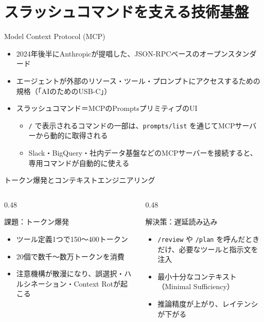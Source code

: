 \documentclass[aspectratio=169,11pt]{beamer}
\newcommand{\cmd}[1]{\texttt{#1}}
\begin{document}
\section{スラッシュコマンドを支える技術基盤}

\begin{frame}{Model Context Protocol (MCP)}
  \begin{itemize}
    \item 2024年後半にAnthropicが提唱した、JSON-RPCベースのオープンスタンダード\cite{r3}
    \item エージェントが外部のリソース・ツール・プロンプトにアクセスするための規格（「AIのためのUSB-C」\cite{r11}）
    \item スラッシュコマンド＝MCPの\alert{Prompts}プリミティブのUI\cite{r4}
      \begin{itemize}
        \item \cmd{/} で表示されるコマンドの一部は、\cmd{prompts/list} を通じてMCPサーバーから動的に取得される\cite{r3}
        \item Slack・BigQuery・社内データ基盤などのMCPサーバーを接続すると、専用コマンドが自動的に使える
      \end{itemize}
  \end{itemize}
\end{frame}

\begin{frame}{トークン爆発とコンテキストエンジニアリング}
  \begin{columns}[T]
    \begin{column}{0.48\textwidth}
      \begin{alertblock}{課題：トークン爆発}
        \begin{itemize}
          \item ツール定義1つで150〜400トークン
          \item 20個で数千〜数万トークンを消費\cite{r15}
          \item 注意機構が散漫になり、誤選択・ハルシネーション・Context Rotが起こる
        \end{itemize}
      \end{alertblock}
    \end{column}
    \begin{column}{0.48\textwidth}
      \begin{exampleblock}{解決策：遅延読み込み}
        \begin{itemize}
          \item \cmd{/review} や \cmd{/plan} を呼んだときだけ、必要なツールと指示文を注入
          \item 最小十分なコンテキスト（Minimal Sufficiency）
          \item 推論精度が上がり、レイテンシが下がる\cite{r15}
        \end{itemize}
      \end{exampleblock}
    \end{column}
  \end{columns}
\end{frame}
\end{document}
